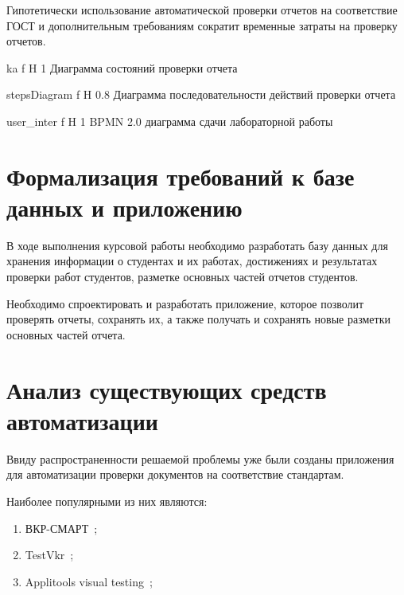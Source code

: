 Гипотетически использование автоматической проверки отчетов на соответствие ГОСТ и дополнительным требованиям сократит временные затраты на проверку отчетов.


{ka} %
{f} %
{H} %
{1\textwidth} %
{Диаграмма состояний проверки отчета} %

{stepsDiagram} %
{f} %
{H} %
{0.8\textwidth} %
{Диаграмма последовательности действий проверки отчета} %

{user_inter} %
{f} %
{H} %
{1\textwidth} %
{BPMN 2.0 диаграмма сдачи лабораторной работы} %


\section{Формализация требований к базе данных и приложению}
В ходе выполнения курсовой работы необходимо разработать базу данных для хранения информации о студентах и их работах, достижениях и результатах проверки работ студентов, разметке основных частей отчетов студентов.

Необходимо спроектировать и разработать приложение, которое позволит проверять отчеты, сохранять их, а также получать и сохранять новые разметки основных частей отчета.


\section{Анализ существующих средств автоматизации}
Ввиду распространенности решаемой проблемы уже были созданы приложения для автоматизации проверки документов на соответствие стандартам.

Наиболее популярными из них являются:
\begin{enumerate}
	\item ВКР-СМАРТ~\cite{VKR_VYZ};
	\item TestVkr~\cite{TestVkr};
	\item Applitools visual testing~\cite{PdfTest};
\end{enumerate}

